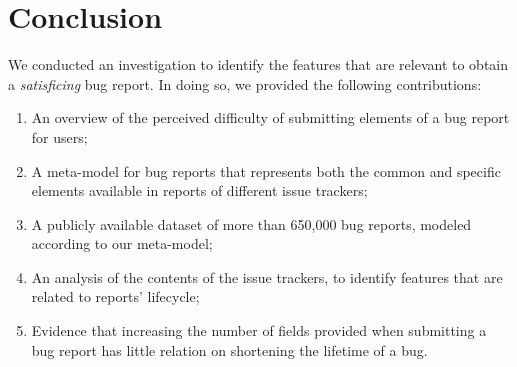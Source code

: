 \section{Conclusion} \label{sec:conclusions}

We conducted an investigation to identify the features that are relevant to obtain a \emph{satisficing} bug report. In doing so, we provided the following contributions:

\begin{enumerate}

\item An overview of the perceived difficulty of submitting elements of a bug report for users;

\item A meta-model for bug reports that represents both the common and specific elements available in reports of different issue trackers;

\item A publicly available dataset of more than 650,000 bug reports, modeled according to our meta-model;

\item An analysis of the contents of the issue trackers, to identify features that are related to reports' lifecycle;

\item Evidence that increasing the number of fields provided when submitting a bug report has little relation on shortening the lifetime of a bug.

\end{enumerate}
